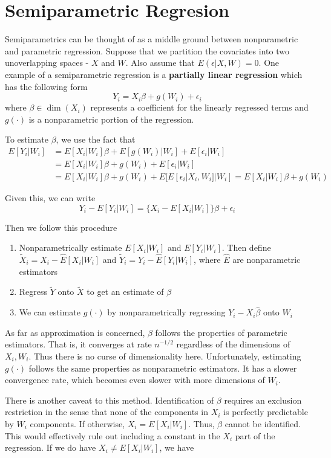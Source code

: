 \section{Semiparametric Regresion}
Semiparametrics can be thought of as a middle ground between nonparametric and parametric regression. Suppose that we partition the covariates into two unoverlapping spaces - $X$ and $W$. Also assume that $E(\epsilon|X,W)=0$. One example of a semiparametric regression is a \textbf{partially linear regression} which has the following form
\[
Y_i = X_i\beta + g(W_i)+\epsilon_i 
\]
where $\beta\in\dim{(X_i)} $ represents a coefficient for the linearly regressed terms and $g(\cdot)$ is a nonparametric portion of the regression.  \par
To estimate $\beta$, we use the fact that
\begin{align*}
E[Y_i|W_i]&=E[X_i|W_i]\beta + E[g(W_i)|W_i]+E[\epsilon_i|W_i]\\
&=E[X_i|W_i]\beta + g(W_i)+E[\epsilon_i|W_i]\\
&=E[X_i|W_i]\beta + g(W_i)+E[E[\epsilon_i|X_i,W_i]|W_i] = E[X_i|W_i]\beta +g(W_i)
\end{align*}\par
Given this, we can write
\[
Y_i-E[Y_i|W_i]=\{X_i-E[X_i|W_i]\}\beta +\epsilon_i
\]\par
Then we follow this procedure
\begin{enumerate}
\item Nonparametrically estimate $E[X_i|W_i]$ and $E[Y_i|W_i]$. Then define $\tilde{X}_i=X_i-\hat{E}[X_i|W_i]$ and $\tilde{Y}_i = Y_i-\hat{E}[Y_i|W_i]$, where $\hat{E}$ are nonparametric estimators
\item Regress $\tilde{Y}$ onto $\tilde{X}$ to get an estimate of $\beta$
\item We can estimate $g(\cdot)$ by nonparametrically regressing $Y_i-X_i\hat{\beta}$ onto $W_i$
\end{enumerate}
\par
As far as approximation is concerned, $\beta$ follows the properties of parametric estimators. That is, it converges at rate $n^{-1/2}$ regardless of the dimensions of $X_i, W_i$. Thus there is no curse of dimensionality here. Unfortunately, estimating $g(\cdot)$ follows the same properties as nonparametric estimators. It has a slower convergence rate, which becomes even slower with more dimensions of $W_i$. \par
There is another caveat to this method. Identification of $\beta$ requires an exclusion restriction in the sense that none of the components in $X_i$ is perfectly predictable by $W_i$ components. If otherwise, $X_i=E[X_i|W_i]$. Thus, $\beta$ cannot be identified. This would effectively rule out including a constant in the $X_i$ part of the regression. If we do have $X_i\neq E[X_i|W_i]$, we have
